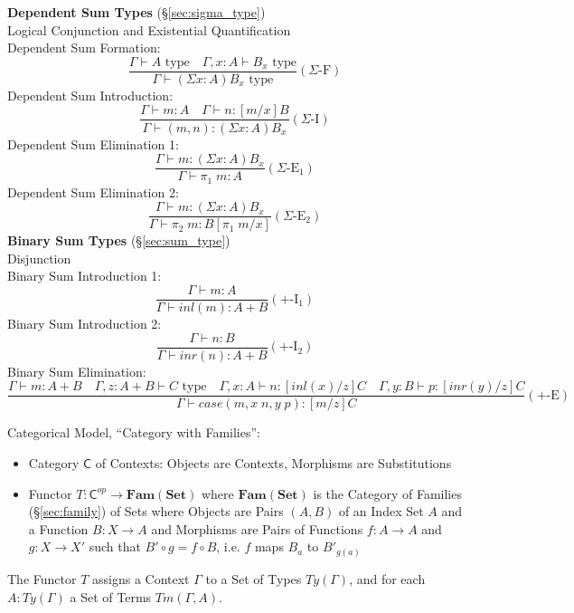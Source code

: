 \textbf{Dependent Sum Types} (\S\ref{sec:sigma_type})
\\
Logical Conjunction and Existential Quantification
\\
Dependent Sum Formation:
\[
  \frac{
    \Gamma \vdash A \text{ type} \quad
    \Gamma, x : A \vdash B_x \text{ type}
  }{
    \Gamma \vdash (\Sigma x:A) B_x \text{ type}
  } (\Sigma\text{-F})
\]
Dependent Sum Introduction:
\[
  \frac{
    \Gamma \vdash m : A \quad
    \Gamma \vdash n : [m/x]B
  }{
    \Gamma \vdash (m,n) : (\Sigma x:A) B_x
  } (\Sigma\text{-I})
\]
Dependent Sum Elimination 1:
\[
  \frac{
    \Gamma \vdash m : (\Sigma x:A) B_x
  }{
    \Gamma \vdash \pi_1\;m : A
  } (\Sigma\text{-E$_1$})
\]
Dependent Sum Elimination 2:
\[
  \frac{
    \Gamma \vdash m : (\Sigma x:A) B_x
  }{
    \Gamma \vdash \pi_2\;m : B[\pi_1\;m/x]
  } (\Sigma\text{-E$_2$})
\]
\textbf{Binary Sum Types} (\S\ref{sec:sum_type})
\\
Disjunction
\\
Binary Sum Introduction 1:
\[
  \frac{
    \Gamma \vdash m : A
  }{
    \Gamma \vdash inl(m) : A + B
  } (+\text{-I}_1)
\]
Binary Sum Introduction 2:
\[
  \frac{
    \Gamma \vdash n : B
  }{
    \Gamma \vdash inr(n) : A + B
  } (+\text{-I}_2)
\]
Binary Sum Elimination:
\[
  \frac{
    \Gamma \vdash m : A + B \quad
    \Gamma, z : A + B \vdash C \text{ type} \quad
    \Gamma, x : A \vdash n : [inl(x)/z]C \quad
    \Gamma, y : B \vdash p : [inr(y)/z]C
  }{
    \Gamma \vdash case (m, x\;n, y\;p) : [m/z]C
  } (+\text{-E})
\]



Categorical Model, ``Category with Families'':

\begin{itemize}
  \item Category $\mathsf{C}$ of Contexts: Objects are Contexts,
    Morphisms are Substitutions
  \item Functor $T : \mathsf{C}^{op} \rightarrow \mathbf{Fam(Set)}$
    where $\mathbf{Fam(Set)}$ is the Category of Families
    (\S\ref{sec:family}) of Sets where Objects are Pairs $(A,B)$ of an
    Index Set $A$ and a Function $B: X \rightarrow A$ and Morphisms
    are Pairs of Functions $f: A \rightarrow A$ and $g: X \rightarrow
    X'$ such that $B' \circ g = f \circ B$, i.e. $f$ maps $B_a$ to
    $B'_{g(a)}$
\end{itemize}

The Functor $T$ assigns a Context $\Gamma$ to a Set of Types
$Ty(\Gamma)$, and for each $A : Ty(\Gamma)$ a Set of Terms
$Tm(\Gamma,A)$.

